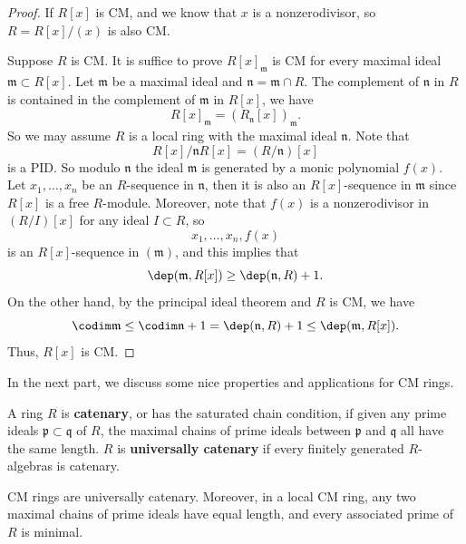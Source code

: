 \begin{proof}
    If \(R[x]\) is CM, and we know that \(x\) is a nonzerodivisor, so \(R=R[x]/(x)\) is also CM.
    
    Suppose \(R\) is CM. It is suffice to prove \(R[x]_\mathfrak{m}\) is CM for every maximal ideal \(\mathfrak{m}\subset R[x]\). Let \(\mathfrak{m}\) be a maximal ideal and \(\mathfrak{n}=\mathfrak{m}\cap R\). The complement of \(\mathfrak{n}\) in \(R\) is contained in the complement of \(\mathfrak{m}\) in \(R[x]\), we have 
    \[R[x]_\mathfrak{m}=(R_\mathfrak{n}[x])_\mathfrak{m}.\]
    So we may assume \(R\) is a local ring with the maximal ideal \(\mathfrak{n}\). Note that
    \[R[x]/\mathfrak{n}R[x]=(R/\mathfrak{n})[x]\]
    is a PID. So modulo \(\mathfrak{n}\) the ideal \(\mathfrak{m}\) is generated by a monic polynomial \(f(x)\). Let \(x_1,\ldots,x_n\) be an \(R\)-sequence in \(\mathfrak{n}\), then it is also an \(R[x]\)-sequence in \(\mathfrak{m}\) since \(R[x]\) is a free \(R\)-module. Moreover, note that \(f(x)\) is a nonzerodivisor in \((R/I)[x]\) for any ideal \(I\subset R\), so 
    \[x_1,\ldots,x_n,f(x)\]
    is an \(R[x]\)-sequence in \((\mathfrak{m})\), and this implies that 
    \[\dep(\mathfrak{m},R[x])\geq \dep (\mathfrak{n},R)+1.\]
    On the other hand, by the principal ideal theorem and \(R\) is CM, we have 
    \[\codim \mathfrak{m}\leq \codim \mathfrak{n}+1=\dep (\mathfrak{n}, R)+1\leq \dep (\mathfrak{m},R[x]).\]
    Thus, \(R[x]\) is CM.  
\end{proof}

In the next part, we discuss some nice properties and applications for CM rings. 

\begin{definition}[Catenary]
     A ring \(R\) is \textbf{catenary}, or has the saturated chain condition, if given any prime ideals \(\mathfrak{p}\subset \mathfrak{q}\) of \(R\), the maximal chains of prime ideals between \(\mathfrak{p}\) and \(\mathfrak{q}\) all have the same length. \(R\) is \textbf{universally catenary} if every finitely generated \(R\)-algebras is catenary.  
\end{definition}

\begin{corollary}\label{CMcatenary}
  CM rings are universally catenary. Moreover, in a local CM ring, any two maximal chains of prime ideals have equal length, and every associated prime of \(R\) is minimal. 
\end{corollary}

